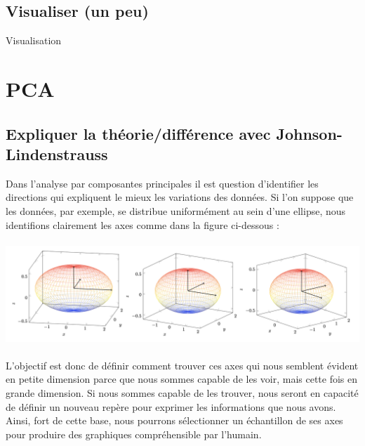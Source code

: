 \newpage


        \subsection{Visualiser (un peu)}
        Visualisation


        \newpage













    \section{PCA}
        \subsection{Expliquer la théorie/différence avec Johnson-Lindenstrauss}
            Dans l’analyse par composantes principales il est question d’identifier les directions qui expliquent le mieux les variations des données. Si l’on suppose que les données, par exemple, se distribue uniformément au sein d’une ellipse, nous identifions clairement les axes comme dans la figure ci-dessous :
            \\
            \\
            \includegraphics[width=\linewidth]{./img/reduction_dim/pca/elipse}
            \\
            \\
            L’objectif est donc de définir comment trouver ces axes qui nous semblent évident en petite dimension parce que nous sommes capable de les voir, mais cette fois en grande dimension. Si nous sommes capable de les trouver, nous seront en capacité de définir un nouveau repère pour exprimer les informations que nous avons. Ainsi, fort de cette base, nous pourrons sélectionner un échantillon de ses axes pour produire des graphiques compréhensible par l’humain.
            \\
            \\
